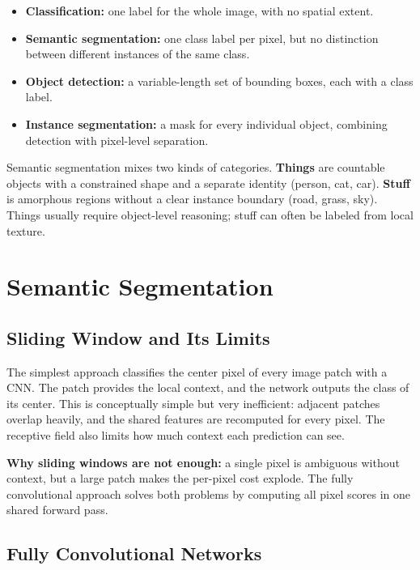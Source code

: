 \begin{itemize}[leftmargin=*]
    \item \textbf{Classification:} one label for the whole image, with no spatial extent.
    \item \textbf{Semantic segmentation:} one class label per pixel, but no distinction between different instances of the same class.
    \item \textbf{Object detection:} a variable-length set of bounding boxes, each with a class label.
    \item \textbf{Instance segmentation:} a mask for every individual object, combining detection with pixel-level separation.
\end{itemize}

Semantic segmentation mixes two kinds of categories. \textbf{Things} are countable objects with a constrained shape and a separate identity (person, cat, car). \textbf{Stuff} is amorphous regions without a clear instance boundary (road, grass, sky). Things usually require object-level reasoning; stuff can often be labeled from local texture.

\section{Semantic Segmentation}

\subsection{Sliding Window and Its Limits}

The simplest approach classifies the center pixel of every image patch with a CNN. The patch provides the local context, and the network outputs the class of its center. This is conceptually simple but very inefficient: adjacent patches overlap heavily, and the shared features are recomputed for every pixel. The receptive field also limits how much context each prediction can see.

\begin{Notebox}
\textbf{Why sliding windows are not enough:} a single pixel is ambiguous without context, but a large patch makes the per-pixel cost explode. The fully convolutional approach solves both problems by computing all pixel scores in one shared forward pass.
\end{Notebox}

\subsection{Fully Convolutional Networks}

